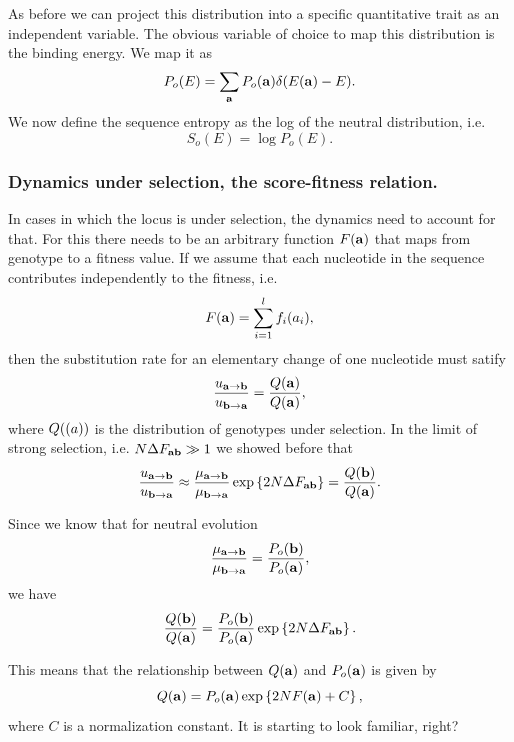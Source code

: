 As before we can project this distribution into a specific quantitative trait as
an independent variable. The obvious variable of choice to map this distribution
is the binding energy. We map it as
\begin{equation}
  P_o(E) = \sum_{\mathbf{a}} P_o(\mathbf{a})  \delta (E(\mathbf{a}) - E).
\end{equation}
We now define the sequence entropy as the log of the neutral distribution, i.e.
\begin{equation}
  S_o(E) = \log P_o (E).
\end{equation}

\subsubsection{Dynamics under selection, the score-fitness relation.}

In cases in which the locus is under selection, the dynamics need to account for
that. For this there needs to be an arbitrary function $F(\mathbf{a})$ that maps
from genotype to a fitness value. If we assume that each nucleotide in the
sequence contributes independently to the fitness, i.e.
\begin{equation}
  F(\mathbf{a}) = \sum_{i = 1}^l f_i (a_i),
\end{equation}
then the substitution rate for an elementary change of one nucleotide must
satify
\begin{equation}
  {u_{\mathbf{a} \rightarrow \mathbf{b}}\over u_{\mathbf{b} \rightarrow \mathbf{a}}} = {Q (\mathbf{a}) \over Q(\mathbf{a})},
\end{equation}
where $Q(\mathbf{(}a))$ is the distribution of genotypes under selection. In the
limit of strong selection, i.e. $N \Delta F_{\mathbf{ab}} \gg 1$ we showed before that
\begin{equation}
  {u_{\mathbf{a} \rightarrow \mathbf{b}}\over u_{\mathbf{b} \rightarrow \mathbf{a}}} \approx {\mu_{\mathbf{a} \rightarrow \mathbf{b}}\over \mu_{\mathbf{b} \rightarrow \mathbf{a}}}
  \exp \left\{ 2 N \Delta F_{\mathbf{ab}} \right\} = {Q(\mathbf{b}) \over Q(\mathbf{a})}.
\end{equation}

Since we know that for neutral evolution
\begin{equation}
  {\mu_{\mathbf{a} \rightarrow \mathbf{b}}\over \mu_{\mathbf{b} \rightarrow \mathbf{a}}} = {P_o(\mathbf{b}) \over P_o(\mathbf{a})},
\end{equation}
we have
\begin{equation}
  {Q(\mathbf{b}) \over Q(\mathbf{a})} = {P_o(\mathbf{b}) \over P_o(\mathbf{a})}
  \exp \left\{ 2 N \Delta F_{\mathbf{ab}} \right\}.
\end{equation}

This means that the relationship between $Q(\mathbf{a})$ and $P_o(\mathbf{a})$ is given
by
\begin{equation}
  Q(\mathbf{a}) = P_o(\mathbf{a}) \exp \left\{ 2 N F(\mathbf{a}) + C \right\},
\end{equation}
where $C$ is a normalization constant. It is starting to look familiar, right?

